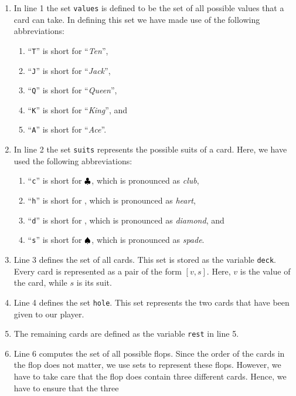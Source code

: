 \begin{enumerate}
\item In line 1 the set \texttt{values} is defined to be the set of all possible values that a card
      can take.  In defining this set we have made use of the following abbreviations:
      \begin{enumerate}
      \item ``\texttt{T}'' is short for ``\emph{Ten}'',
      \item ``\texttt{J}'' is short for ``\emph{Jack}'',
      \item ``\texttt{Q}'' is short for ``\emph{Queen}'',
      \item ``\texttt{K}'' is short for ``\emph{King}'', and
      \item ``\texttt{A}'' is short for ``\emph{Ace}''.
      \end{enumerate}
\item In line 2 the set \texttt{suits} represents the possible suits of a card.  Here, we have used
      the following abbreviations:
      \begin{enumerate}
      \item ``\texttt{c}'' is short for $\clubsuit $, which is pronounced as \emph{club},
      \item ``\texttt{h}'' is short for \mbox{\color{red}{$\heart$}}, which is pronounced as \emph{heart}, 
      \item ``\texttt{d}'' is short for \mbox{\color{red}{$\diamondsuit$}}, which is pronounced as \emph{diamond}, and 
      \item ``\texttt{s}'' is short for $\spadesuit $, which is pronounced as \emph{spade}. 
      \end{enumerate} 
\item Line 3 defines the set of all cards.  This set is stored as the variable \texttt{deck}.  Every
      card is represented as a pair of the form $[v,s]$. Here, $v$ is the value of the card, while $s$ is its suit.
\item Line 4 defines the set \texttt{hole}.  This set represents the two cards that have been given to our player.
\item The remaining cards are defined as the variable  \texttt{rest} in line 5.
\item Line 6 computes the set of all possible flops.  Since the order of the cards in the flop does
      not matter, we use sets to represent these flops.  However, we have to take care that the flop
      does contain three \colorbox{amethyst}{different} cards.  Hence, we have to ensure that the three

\end{enumerate}
